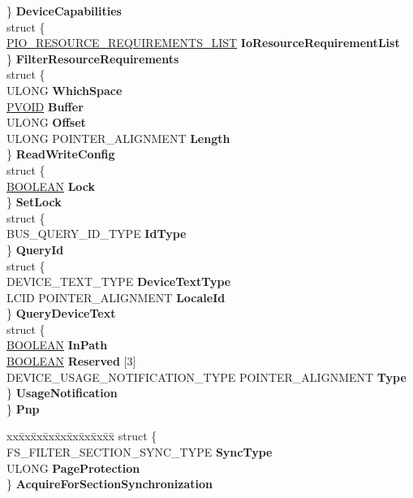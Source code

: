 \begin{DoxyCompactItemize}
\begin{tabbing}
\>\} {\bfseries DeviceCapabilities}\\
\>struct \{\\
\>\>\hyperlink{struct___i_o___r_e_s_o_u_r_c_e___r_e_q_u_i_r_e_m_e_n_t_s___l_i_s_t}{PIO\_RESOURCE\_REQUIREMENTS\_LIST} {\bfseries IoResourceRequirementList}\\
\>\} {\bfseries FilterResourceRequirements}\\
\>struct \{\\
\>\>ULONG {\bfseries WhichSpace}\\
\>\>\hyperlink{interfacevoid}{PVOID} {\bfseries Buffer}\\
\>\>ULONG {\bfseries Offset}\\
\>\>ULONG POINTER\_ALIGNMENT {\bfseries Length}\\
\>\} {\bfseries ReadWriteConfig}\\
\>struct \{\\
\>\>\hyperlink{_processor_bind_8h_a112e3146cb38b6ee95e64d85842e380a}{BOOLEAN} {\bfseries Lock}\\
\>\} {\bfseries SetLock}\\
\>struct \{\\
\>\>BUS\_QUERY\_ID\_TYPE {\bfseries IdType}\\
\>\} {\bfseries QueryId}\\
\>struct \{\\
\>\>DEVICE\_TEXT\_TYPE {\bfseries DeviceTextType}\\
\>\>LCID POINTER\_ALIGNMENT {\bfseries LocaleId}\\
\>\} {\bfseries QueryDeviceText}\\
\>struct \{\\
\>\>\hyperlink{_processor_bind_8h_a112e3146cb38b6ee95e64d85842e380a}{BOOLEAN} {\bfseries InPath}\\
\>\>\hyperlink{_processor_bind_8h_a112e3146cb38b6ee95e64d85842e380a}{BOOLEAN} {\bfseries Reserved} \mbox{[}3\mbox{]}\\
\>\>DEVICE\_USAGE\_NOTIFICATION\_TYPE POINTER\_ALIGNMENT {\bfseries Type}\\
\>\} {\bfseries UsageNotification}\\
\} {\bfseries Pnp}\\

\end{tabbing}\item 
\mbox{\label{union___f_l_t___p_a_r_a_m_e_t_e_r_s_a3a0eaae306fa2a218fc188243caea717}} 
\begin{tabbing}
xx\=xx\=xx\=xx\=xx\=xx\=xx\=xx\=xx\=\kill
struct \{\\
\>FS\_FILTER\_SECTION\_SYNC\_TYPE {\bfseries SyncType}\\
\>ULONG {\bfseries PageProtection}\\
\} {\bfseries AcquireForSectionSynchronization}\\


\end{tabbing}
\end{DoxyCompactItemize}
